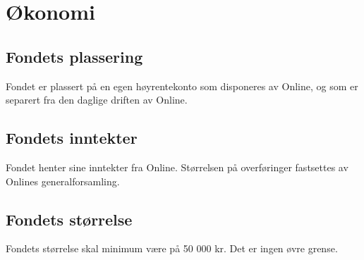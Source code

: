 \chapter{Økonomi}

\section{Fondets plassering}

Fondet er plassert på en egen høyrentekonto som disponeres av Online, og som er separert fra den daglige driften av Online.

\section{Fondets inntekter}

Fondet henter sine inntekter fra Online. Størrelsen på overføringer fastsettes av Onlines generalforsamling.

\section{Fondets størrelse}
Fondets størrelse skal minimum være på 50 000 kr. Det er ingen øvre grense.
